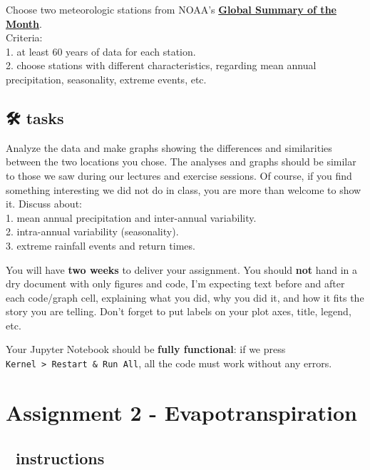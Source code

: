 \documentclass[
  letterpaper,
  DIV=11,
  numbers=noendperiod]{scrreprt}
\begin{document}
Choose two meteorologic stations from NOAA's
\textbf{\href{https://gis.ncdc.noaa.gov/maps/ncei/cdo/monthly}{Global
Summary of the Month}}.\\
Criteria:\\
1. at least 60 years of data for each station.\\
2. choose stations with different characteristics, regarding mean annual
precipitation, seasonality, extreme events, etc.

\hypertarget{tasks-1}{%
\section{🛠 tasks}\label{tasks-1}}

Analyze the data and make graphs showing the differences and
similarities between the two locations you chose. The analyses and
graphs should be similar to those we saw during our lectures and
exercise sessions. Of course, if you find something interesting we did
not do in class, you are more than welcome to show it. Discuss about:\\
1. mean annual precipitation and inter-annual variability.\\
2. intra-annual variability (seasonality).\\
3. extreme rainfall events and return times.

You will have \textbf{two weeks} to deliver your assignment. You should
\textbf{not} hand in a dry document with only figures and code, I'm
expecting text before and after each code/graph cell, explaining what
you did, why you did it, and how it fits the story you are telling.
Don't forget to put labels on your plot axes, title, legend, etc.

Your Jupyter Notebook should be \textbf{fully functional}: if we press
\texttt{Kernel\ \textgreater{}\ Restart\ \&\ Run\ All}, all the code
must work without any errors.

\hypertarget{assignment-2---evapotranspiration}{%
\chapter{Assignment 2 -
Evapotranspiration}\label{assignment-2---evapotranspiration}}

\hypertarget{instructions-1}{%
\section{📒 instructions}\label{instructions-1}}
\end{document}
